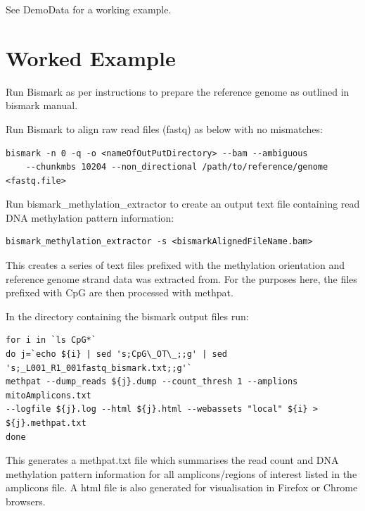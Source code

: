 \documentclass[11pt,a4paper]{article}
\begin{document}
See DemoData for a working example. 

\section{Worked Example}
Run Bismark as per instructions to prepare the reference genome as outlined in bismark manual.

Run Bismark to align raw read files (fastq) as below with no mismatches:
\begin{verbatim}
bismark -n 0 -q -o <nameOfOutPutDirectory> --bam --ambiguous 
	--chunkmbs 10204 --non_directional /path/to/reference/genome <fastq.file>
\end{verbatim}

Run bismark\_methylation\_extractor to create an output text file containing read DNA methylation pattern information:
\begin{verbatim}
bismark_methylation_extractor -s <bismarkAlignedFileName.bam>
\end{verbatim}

This creates a series of text files prefixed with the methylation orientation and reference genome strand data was extracted from. 
For the purposes here, the files prefixed with CpG are then processed with methpat.

In the directory containing the bismark output files run:
\begin{verbatim}
for i in `ls CpG*`
do j=`echo ${i} | sed 's;CpG\_OT\_;;g' | sed 's;_L001_R1_001fastq_bismark.txt;;g'`
methpat --dump_reads ${j}.dump --count_thresh 1 --amplions mitoAmplicons.txt
--logfile ${j}.log --html ${j}.html --webassets "local" ${i} > ${j}.methpat.txt
done
\end{verbatim}

This generates a methpat.txt file which summarises the read count and DNA methylation pattern information for all amplicons/regions
of interest listed in the amplicons file. A html file is also generated for visualisation in Firefox or Chrome browsers.
\end{document}

